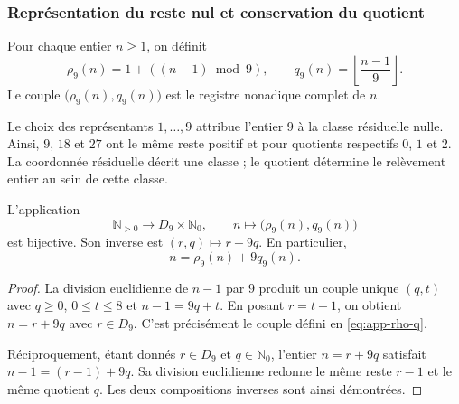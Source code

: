 \subsubsection{Représentation du reste nul et conservation du quotient}

\begin{definicion}
\label{def:app-residuo}
Pour chaque entier $n\geq1$, on définit
\begin{equation}
 \rho_9(n)=1+((n-1)\bmod9),\qquad
 q_9(n)=\left\lfloor\frac{n-1}{9}\right\rfloor.
 \label{eq:app-rho-q}
\end{equation}
Le couple $\bigl(\rho_9(n),q_9(n)\bigr)$ est le registre nonadique complet de $n$.
\end{definicion}

Le choix des représentants $1,\ldots,9$ attribue l'entier $9$ à la classe résiduelle nulle. Ainsi, $9$, $18$ et $27$ ont le même reste positif et pour quotients respectifs $0$, $1$ et $2$. La coordonnée résiduelle décrit une classe ; le quotient détermine le relèvement entier au sein de cette classe.

\begin{bloqueindivisible}
\begin{proposicion}
\label{thm:app-reconstruccion}
L'application
\begin{equation}
 \mathbb N_{>0}\longrightarrow D_9\times\mathbb N_0,
 \qquad n\longmapsto\bigl(\rho_9(n),q_9(n)\bigr)
\end{equation}
est bijective. Son inverse est $(r,q)\mapsto r+9q$. En particulier,
\begin{equation}
 n=\rho_9(n)+9q_9(n).
 \label{eq:app-restitution}
\end{equation}
\end{proposicion}

\begin{proof}
La division euclidienne de $n-1$ par $9$ produit un couple unique $(q,t)$ avec $q\geq0$, $0\leq t\leq8$ et $n-1=9q+t$. En posant $r=t+1$, on obtient $n=r+9q$ avec $r\in D_9$. C'est précisément le couple défini en \eqref{eq:app-rho-q}.

Réciproquement, étant donnés $r\in D_9$ et $q\in\mathbb N_0$, l'entier $n=r+9q$ satisfait $n-1=(r-1)+9q$. Sa division euclidienne redonne le même reste $r-1$ et le même quotient $q$. Les deux compositions inverses sont ainsi démontrées.
\end{proof}
\end{bloqueindivisible}

